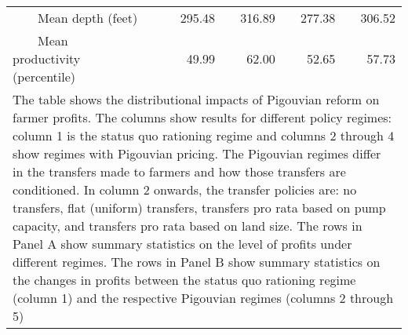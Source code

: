 \begin{table}[!ht]
\begin{tabular}{lrrrrr}
		~~~~Mean depth (feet)&  &295.48&316.89&277.38&306.52\\
		~~~~Mean productivity (percentile)&  &49.99&62.00&52.65&57.73\\
		\bottomrule
\multicolumn{6}{p{0.80\hsize}}{\footnotesize The table shows the distributional impacts of Pigouvian reform on farmer profits. The columns show results for different policy regimes: column 1 is the status quo rationing regime and columns 2 through 4 show regimes with Pigouvian pricing. The Pigouvian regimes differ in the transfers made to farmers and how those transfers are conditioned. In column 2 onwards, the transfer policies are: no transfers, flat (uniform) transfers, transfers pro rata based on pump capacity, and transfers pro rata based on land size. The rows in Panel A show summary statistics on the level of profits under different regimes. The rows in Panel B show summary statistics on the changes in profits between the status quo rationing regime (column 1) and the respective Pigouvian regimes (columns 2 through 5)} \\
	\end{tabular}
\end{table}
